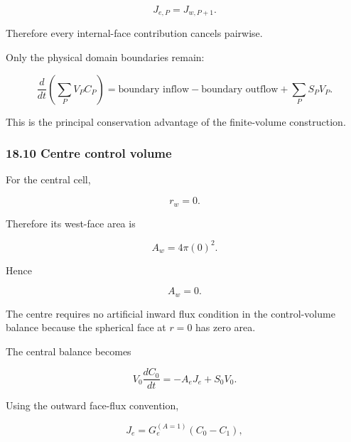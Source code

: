 \documentclass[11pt,a4paper]{article}
\begin{document}
\begin{equation}
J_{e,P}=J_{w,P+1}.
\tag{TRISO-FV-162}
\label{eq:triso-fv-162}
\end{equation}

Therefore every internal-face contribution cancels pairwise.

Only the physical domain boundaries remain:

\begin{equation}
\boxed{
\frac{d}{dt}
\left(
\sum_PV_PC_P
\right)
=
\text{boundary inflow}
-
\text{boundary outflow}
+
\sum_PS_PV_P.
}
\tag{TRISO-FV-163}
\label{eq:triso-fv-163}
\end{equation}

This is the principal conservation advantage of the finite-volume construction.

\subsubsection*{18.10 Centre control volume}

For the central cell,

\begin{equation}
r_w=0.
\tag{TRISO-FV-164}
\label{eq:triso-fv-164}
\end{equation}

Therefore its west-face area is

\begin{equation}
A_w=4\pi(0)^2.
\tag{TRISO-FV-165}
\label{eq:triso-fv-165}
\end{equation}

Hence

\begin{equation}
\boxed{
A_w=0.
}
\tag{TRISO-FV-166}
\label{eq:triso-fv-166}
\end{equation}

The centre requires no artificial inward flux condition in the control-volume balance because the spherical face at $r=0$ has zero area.

The central balance becomes

\begin{equation}
\boxed{
V_0\frac{dC_0}{dt}
=
-A_eJ_e
+
S_0V_0.
}
\tag{TRISO-FV-167}
\label{eq:triso-fv-167}
\end{equation}

Using the outward face-flux convention,

\begin{equation}
J_e
=
G_e^{(A=1)}(C_0-C_1),
\tag{TRISO-FV-168}
\label{eq:triso-fv-168}
\end{equation}
\end{document}
